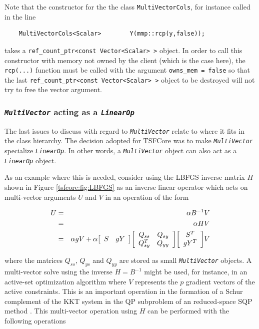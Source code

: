 Note that the constructor for the the class \texttt{MultiVectorCols},
for instance called in the line

{\tiny\begin{verbatim}
    MultiVectorCols<Scalar>        Y(mmp::rcp(y,false));
\end{verbatim}}

takes a \texttt{ref\_count\_ptr<const Vector<Scalar> >} object.  In
order to call this constructor with memory not owned by the client
(which is the case here), the \texttt{rcp(...)} function must be
called with the argument \texttt{owns\_mem = false} so that the last
\texttt{ref\_count\_ptr<const Vector<Scalar> >} object to be destroyed
will not try to free the vector argument.

%
\subsubsection{\texttt{\textit{Multi\-Vector}} acting as a \texttt{\textit{LinearOp}}}
\label{tsfcore:sec:multi_vec_linear_op}
%

The last issues to discuss with regard to
\texttt{\textit{Multi\-Vector}} relate to where it fits in the class
hierarchy.  The decision adopted for TSFCore was to make
\texttt{\textit{Multi\-Vector}} specialize \texttt{\textit{LinearOp}}.
In other words, a \texttt{\textit{Multi\-Vector}} object can also act as
a \texttt{\textit{LinearOp}} object.

As an example where this is needed, consider using the LBFGS inverse
matrix $H$ shown in Figure \ref{tsfcore:fig:LBFGS} as an inverse linear
operator which acts on multi-vector arguments $U$ and $V$ in an
operation of the form

\begin{eqnarray*}
U & = & \alpha B^{-1} V \\
  & = & \alpha H V \\
  & = & \alpha g V + \alpha
                            {\bmat{cc} S & g Y \emat}
                            {\bmat{cc} Q_{ss} & Q_{sy} \\ Q_{sy}^T & Q_{yy} \emat}
                            {\bmat{c} S^T \\ g Y^T \emat} V
\end{eqnarray*}

where the matrices $Q_{ss}$, $Q_{ys}$ and $Q_{yy}$ are stored as small
\texttt{\textit{Multi\-Vector}} objects.  A multi-vector solve using
the inverse $H = B^{-1}$ might be used, for instance, in an active-set
optimization algorithm where $V$ represents the $p$ gradient vectors
of the active constraints.  This is an important operation in the
formation of a Schur complement of the KKT system in the QP subproblem
of an reduced-space SQP method \cite{RABartlett_2001}.  This
multi-vector operation using $H$ can be performed with the following
operations

